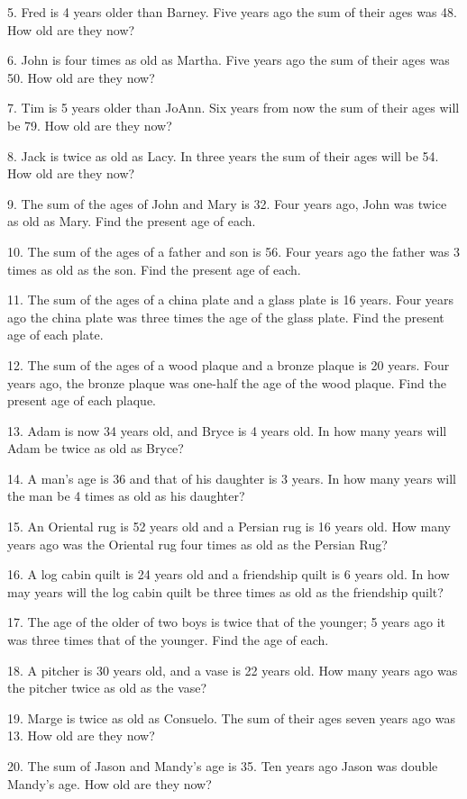 \documentclass[11pt]{book}
\theoremstyle{definition}  %
\begin{document}
5. Fred is 4 years older than Barney. Five years ago the sum of their ages was
48. How old are they now?

6. John is four times as old as Martha. Five years ago the sum of their ages
was 50. How old are they now?

7. Tim is 5 years older than JoAnn. Six years from now the sum of their ages
will be 79. How old are they now?

8. Jack is twice as old as Lacy. In three years the sum of their ages will be
54. How old are they now?

9. The sum of the ages of John and Mary is 32. Four years ago, John was twice
as old as Mary. Find the present age of each.

10. The sum of the ages of a father and son is 56. Four years ago the father
was 3 times as old as the son. Find the present age of each.

11. The sum of the ages of a china plate and a glass plate is 16 years. Four
years ago the china plate was three times the age of the glass
plate. Find the present age of each plate.

12. The sum of the ages of a wood plaque and a bronze plaque is 20 years. Four
years ago, the bronze plaque was one-half the age of the wood
plaque. Find the present age of each plaque.

13. Adam is now 34 years old, and Bryce is 4 years old. In how many years will Adam be twice as old as Bryce?

14. A man's age is 36 and that of his daughter is 3 years. In how many years
will the man be 4 times as old as his daughter?

15. An Oriental rug is 52 years old and a Persian rug is 16 years old. How
many years ago was the Oriental rug four times as old as the
Persian Rug?

16. A log cabin quilt is 24 years old and a friendship quilt is 6 years old.
In how may years will the log cabin quilt be three times as old
as the friendship quilt?

17. The age of the older of two boys is twice that of the younger; 5 years ago
it was three times that of the younger. Find the age of
each.

18. A pitcher is 30 years old, and a vase is 22 years old. How many years ago
was the pitcher twice as old as the vase?

19. Marge is twice as old as Consuelo. The sum of their ages seven years ago
was 13. How old are they now?

20. The sum of Jason and Mandy's age is 35. Ten years ago Jason was double Mandy's age. How old are they now?
\end{document}
